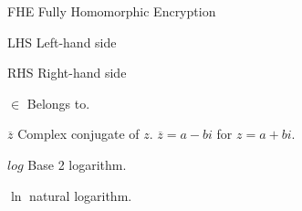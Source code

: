 \begin{siglas}
    \item[FHE] Fully Homomorphic Encryption
    \item[LHS] Left-hand side
    \item[RHS] Right-hand side  
  \end{siglas}
  
  \begin{simbolos}
    \item[$\in$] Belongs to.
    \item[$\overline{z}$] Complex conjugate of $z$. $\overline{z}=a-bi$ for $z=a+bi$.
    \item[$log$] Base 2 logarithm.
    \item[$\ln$] natural logarithm.
    
  \end{simbolos}
